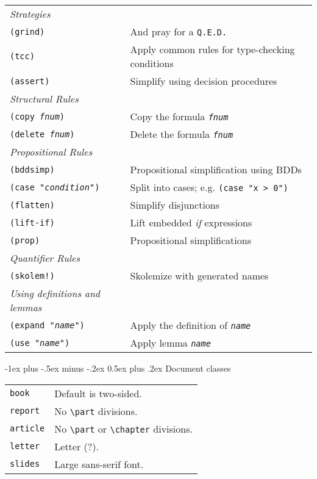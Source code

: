 \documentclass[10pt,landscape]{article}
\makeatletter
\renewcommand{\section}{\@startsection{section}{1}{0mm}%
	{-1ex plus -.5ex minus -.2ex}%
	{0.5ex plus .2ex}%
	{\normalfont\large\bfseries}}
\makeatother
\begin{document}
\begin{multicols}{2}
\begin{tabular}{@{}ll@{}}
	\emph{Strategies} &\\
	\texttt{(grind)} & And pray for a \texttt{Q.E.D.}\\
	\texttt{(tcc)} & Apply common rules for type-checking conditions\\
	\texttt{(assert)} & Simplify using decision procedures\\
	
	\emph{Structural Rules} &\\
	\texttt{(copy \emph{fnum})} & Copy the formula \texttt{\emph{fnum}}\\
	\texttt{(delete \emph{fnum})} & Delete the formula \texttt{\emph{fnum}}\\
	
	\emph{Propositional Rules}&\\
	\texttt{(bddsimp)} & Propositional simplification using BDDs\\
	\texttt{(case "\emph{condition}")} & Split into cases; e.g. \texttt{(case "x > 0")}\\
	\texttt{(flatten)} & Simplify disjunctions\\
	\texttt{(lift-if)} & Lift embedded \emph{if} expressions\\
	\texttt{(prop)} & Propositional simplifications\\
	
	\emph{Quantifier Rules}&\\
	\texttt{(skolem!)} & Skolemize with generated names\\
	
	\emph{Using definitions and lemmas}&\\
	\texttt{(expand "\emph{name}")} & Apply the definition of \texttt{\emph{name}}\\
	\texttt{(use "\emph{name}")} & Apply lemma \texttt{\emph{name}}\\
	
	
\end{tabular}



\pagebreak


\section{Document classes}
\begin{tabular}{@{}ll@{}}
	\verb!book!    & Default is two-sided. \\
	\verb!report!  & No \verb!\part! divisions. \\
	\verb!article! & No \verb!\part! or \verb!\chapter! divisions. \\
	\verb!letter!  & Letter (?). \\
	\verb!slides!  & Large sans-serif font.
\end{tabular}


\end{multicols}
\end{document}
